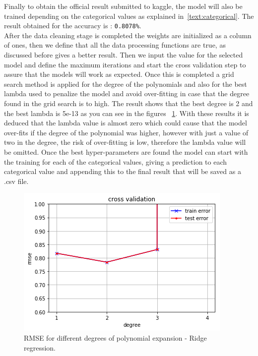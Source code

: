 \documentclass[10pt,conference,compsocconf]{IEEEtran}
\begin{document}
 Finally to obtain the official result submitted to kaggle, the model will also be trained depending
 on the categorical values as explained in~\ref{text:categorical}. The result obtained for the 
 accuracy is :  \texttt{0.8078\%}.\\

After the data cleaning stage is completed the weights are initialized as a column 
of ones, then we define that all the data processing functions are true, as 
discussed before gives a better result. Then we input the value for the selected 
model and define the maximum iterations and start the cross validation step 
to assure that the models will work as expected. Once this is completed a grid search
method is applied for the degree of the polynomials and also for the best
lambda used to penalize the model and avoid over-fitting in case that the 
degree found in the grid search is to high. The result shows that the best degree
is 2 and the best lambda is 5e-13 as you can see in the figures ~\ref{fig:best_degree}. 
With these results it is deduced that the lambda value is almost zero
which could cause that the model over-fits if the degree of the polynomial was
higher, however with just a value of two in the degree, the risk of over-fitting is
low, therefore the lambda value will be omitted. 
Once the best hyper-parameters are found the model can start with the training
for each of the categorical values, giving a prediction to each categorical value
and appending this to the final result that will be saved as a .csv file.

\begin{figure}[H]
  \centering
  \includegraphics[width=\columnwidth]{cross_validation_degree}
  \caption{RMSE for different degrees of polynomial expansion - Ridge regression.}
  \vspace{-3mm}
  \label{fig:best_degree}
\end{figure}
\end{document}
